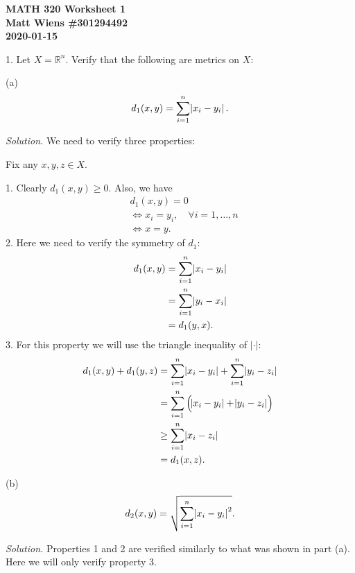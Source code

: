 \documentclass{article}
\newcommand{\R}{\mathbb{R}}
\begin{document}
\textbf{MATH 320 Worksheet 1} \\
\textbf{Matt Wiens \#301294492} \\
\textbf{2020-01-15}

1. Let $X = \R^n$. Verify that the following are metrics on $X$:

(a)
%
\begin{equation*}
    d_1(x, y) = \sum_{i = 1}^n \envert{x_i - y_i}
    .
\end{equation*}

\textit{Solution.}
We need to verify three properties:

Fix any $x, y, z \in X$.

1. Clearly $d_1(x, y) \geq 0$. Also, we have
%
\begin{align*}
    &d_1(x, y) = 0 \\
    &\iff x_i = y_i, \quad \forall i = 1, \ldots, n \\
    &\iff x = y
    .
\end{align*}
%
2. Here we need to verify the symmetry of $d_1$:
%
\begin{align*}
    d_1(x, y) &= \sum_{i = 1}^n \envert{x_i - y_i} \\
              &= \sum_{i = 1}^n \envert{y_i - x_i} \\
              &= d_1(y, x)
    .
\end{align*}
%
3. For this property we will use the triangle inequality of $|\cdot|$:
%
\begin{align*}
    d_1(x, y) + d_1(y, z)
        &= \sum_{i = 1}^n \envert{x_i - y_i} + \sum_{i = 1}^n \envert{y_i - z_i} \\
        &= \sum_{i = 1}^n \del[2]{\envert{x_i - y_i} + \envert{y_i - z_i}} \\
        &\geq \sum_{i = 1}^n \envert{x_i - z_i} \\
        &= d_1(x, z)
    .
\end{align*}

\vspace{3mm}

(b)
%
\begin{equation*}
    d_2(x, y) = \sqrt{\sum_{i = 1}^n {\envert{x_i - y_i}}^2}
    .
\end{equation*}

\textit{Solution.}
Properties 1 and 2 are verified similarly to what was shown in part (a).
Here we will only verify property 3.
\end{document}

